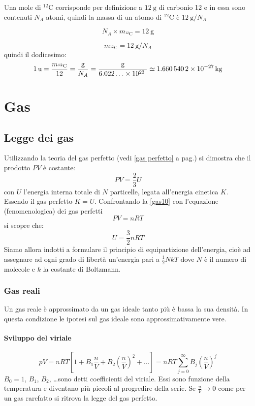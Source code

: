 Una mole di $^{12}\mathrm{C}$ corrisponde per definizione a $\SI{12}{\gram}$ di carbonio 12 e in essa sono contenuti $N_A$ atomi, quindi la massa di un atomo di $^{12}\mathrm{C}$ è $\SI{12}{\gram}/N_A$

$$
N_A \times m_{^{12}\mathrm{C}}=\SI{12}{\gram}
$$

$$
m_{^{12}\mathrm{C}} = \SI{12}{\gram} / N_A
$$
quindi il dodicesimo:
\[
	\SI{1}{\atomicmassunit} = \frac{m_{^{12}\mathrm{C}}}{12} = \frac{\si{\gram}}{N_A} = \frac{\si{\gram}}{6.022\ldots\times 10^{23}\;}\simeq \SI{1.6605402E-27}{\kilogram}
\]

\chapter{Gas}
\minitoc
\section{Legge dei gas}
Utilizzando la teoria del gas perfetto (vedi \ref{gas perfetto} a pag.\@\pageref{gas perfetto}) si dimostra che il prodotto $PV$ è costante:
\begin{equation}
	PV = \frac{2}{3}U
	\label{gas10}
\end{equation}
con $U$ l'energia interna totale di $N$ particelle, legata all'energia cinetica $K$. Essendo il gas perfetto $K=U$. Confrontando la \eqref{gas10} con l'equazione (fenomenologica) dei gas perfetti
\begin{equation}
	PV=nRT
\end{equation}
si scopre che:
\begin{equation}
	U=\frac{3}{2}nRT
\end{equation}
Siamo allora indotti a formulare il principio di equipartizione dell'energia, cioè ad assegnare ad ogni grado di libertà un'energia pari a $\frac{1}{2}NkT$ dove $N$ è il numero di molecole e $k$ la costante di Boltzmann.
\subsection{Gas reali}
Un gas reale è approssimato da un gas ideale tanto più è bassa la sua densità. In questa condizione le ipotesi sul gas ideale sono approssimativamente vere.
\subsubsection{Sviluppo del viriale}
\begin{equation}
	pV=nRT\left[1+B_1\frac{n}{V}+B_2\left(\frac{n}{V}\right)^2+\ldots\right]=nRT\sum_{j=0}^\infty B_j\left(\frac{n}{V}\right)^j
\end{equation}
$B_0=1$, $B_1$, $B_2$, \ldots sono detti coefficienti del viriale. Essi sono funzione della temperatura e diventano più piccoli al progredire della serie. Se $\frac{n}{V}\to 0$ come per un gas rarefatto si ritrova la legge del gas perfetto.
